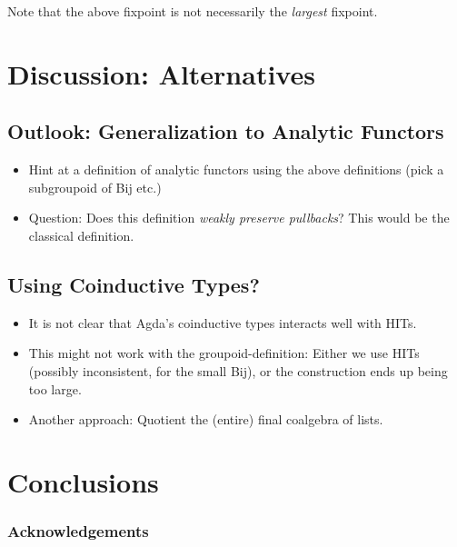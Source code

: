 \documentclass[runningheads]{llncs}
\begin{document}
Note that the above fixpoint is not necessarily the \emph{largest} fixpoint.

\section{Discussion: Alternatives}
\subsection{Outlook: Generalization to Analytic Functors}

\begin{itemize}
    \item Hint at a definition of analytic functors using
        the above definitions (pick a subgroupoid of Bij etc.)
    \item Question:
        Does this definition \emph{weakly preserve pullbacks}?
        This would be the classical definition.
\end{itemize}

\subsection{Using Coinductive Types?}

\begin{itemize}
    \item It is not clear that Agda's coinductive types
        interacts well with HITs.
    \item This might not work with the groupoid-definition:
        Either we use HITs (possibly inconsistent, for the small Bij),
        or the construction ends up being too large.
    \item
        Another approach: Quotient the (entire) final coalgebra of lists.
\end{itemize}

\section{Conclusions}

\subsubsection{Acknowledgements}




\end{document}
